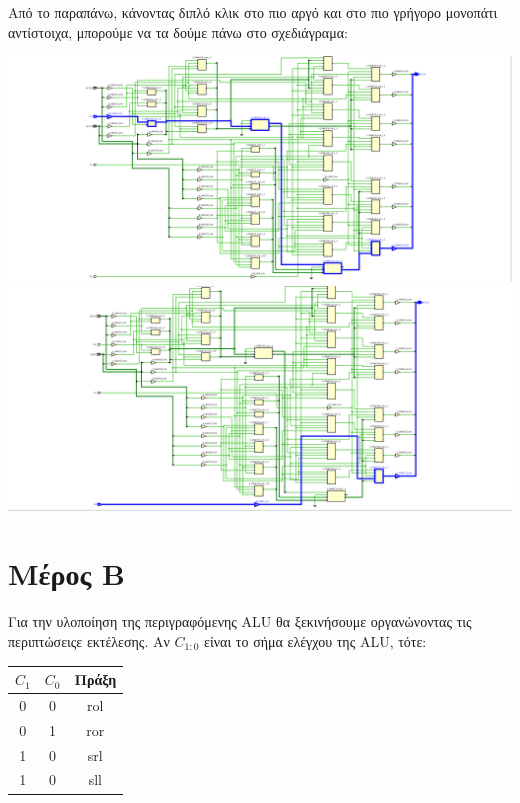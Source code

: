 \documentclass[11pt, a4paper]{report}
\begin{document}
Από το παραπάνω, κάνοντας διπλό κλικ στο πιο αργό και στο πιο γρήγορο μονοπάτι αντίστοιχα, μπορούμε να τα δούμε πάνω στο σχεδιάγραμα:
\begin{center}
	\includegraphics[width=\textwidth]{./images/alu-1/Slowest_Path.png}
	\includegraphics[width=\textwidth]{./images/alu-1/Fastest_Path.png}
\end{center}

\section{Μέρος Β}
Για την υλοποίηση της περιγραφόμενης ALU θα ξεκινήσουμε οργανώνοντας τις περιπτώσειςε εκτέλεσης.
Αν $C_{1:0}$ είναι το σήμα ελέγχου της ALU, τότε:
\begin{center}
  \begin{tabular}{|c|c|c|}
    \hline
    $C_1$ & $C_0$ & Πράξη \\
    \hline
    0 & 0 & rol \\
    0 & 1 & ror \\
    1 & 0 & srl \\
    1 & 0 & sll \\
    \hline
  \end{tabular}
\end{center}
\end{document}
